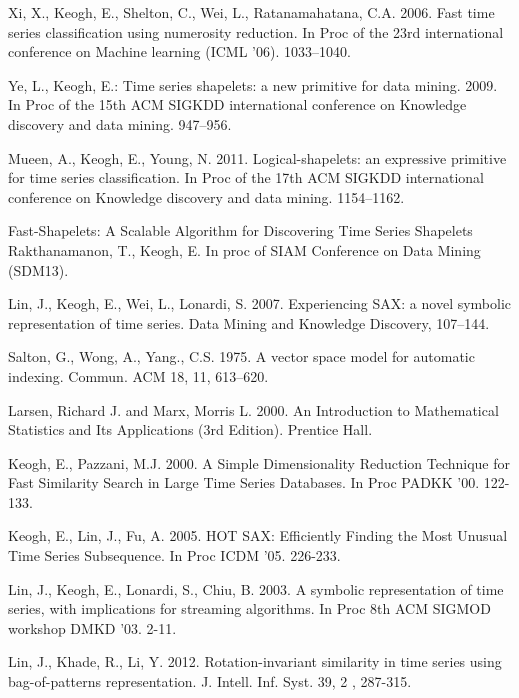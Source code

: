\documentclass{llncs}
\begin{document}
%
%
\begin{thebibliography}{5}

%

Xi, X., Keogh, E., Shelton, C., Wei, L., Ratanamahatana, C.A. 2006. 
Fast time series classification using numerosity reduction. 
In Proc of the 23rd international conference on Machine learning (ICML '06). 1033--1040.

Ye, L., Keogh, E.:
Time series shapelets: a new primitive for data mining. 2009.
In Proc of the 15th ACM SIGKDD international conference on Knowledge discovery and data
mining. 947--956.

Mueen, A., Keogh, E., Young, N. 2011.
Logical-shapelets: an expressive primitive for time series classification.
In Proc of the 17th ACM SIGKDD international conference on Knowledge discovery and data
mining. 1154--1162.

Fast-Shapelets: A Scalable Algorithm for Discovering Time Series Shapelets
Rakthanamanon, T., Keogh, E.
In proc of SIAM Conference on Data Mining (SDM13).

Lin, J., Keogh, E., Wei, L., Lonardi, S. 2007.
Experiencing SAX: a novel symbolic representation of time series.
Data Mining and Knowledge Discovery, 107--144.

Salton, G., Wong, A., Yang., C.S. 1975.
A vector space model for automatic indexing. 
Commun. ACM 18, 11, 613--620.

Larsen, Richard J. and Marx, Morris L. 2000. 
An Introduction to Mathematical Statistics and Its Applications (3rd Edition).
Prentice Hall.

Keogh, E., Pazzani, M.J. 2000.
A Simple Dimensionality Reduction Technique for Fast Similarity Search in Large Time Series
Databases. 
In Proc PADKK '00. 122-133.

Keogh, E., Lin, J., Fu, A. 2005.
HOT SAX: Efficiently Finding the Most Unusual Time Series Subsequence. 
In Proc ICDM '05. 226-233.

Lin, J., Keogh, E., Lonardi, S., Chiu, B. 2003.
A symbolic representation of time series, with implications for streaming algorithms. 
In Proc 8th ACM SIGMOD workshop DMKD '03. 2-11.

Lin, J., Khade, R., Li, Y. 2012.
Rotation-invariant similarity in time series using bag-of-patterns representation. 
J. Intell. Inf. Syst. 39, 2 , 287-315.


\end{thebibliography}
\end{document}
